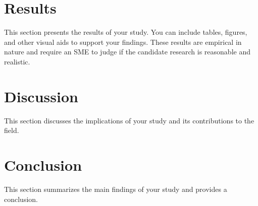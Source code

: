\documentclass[twocolumn]{article}
\begin{document}
\section{Results}
This section presents the results of your study. You can include tables, figures, and other visual aids to support your findings.
These results are empirical in nature and require an SME to judge if the candidate research is reasonable and realistic.

\section{Discussion}
This section discusses the implications of your study and its contributions to the field.

\section{Conclusion}
This section summarizes the main findings of your study and provides a conclusion.



\end{document}
